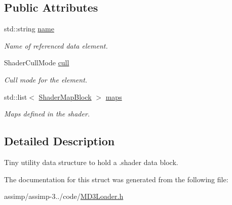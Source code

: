 \subsection*{Public Attributes}
\begin{DoxyCompactItemize}
\item 
\hypertarget{struct_assimp_1_1_q3_shader_1_1_shader_data_block_af92045c74885b17047797307b35e5934}{std\+::string \hyperlink{struct_assimp_1_1_q3_shader_1_1_shader_data_block_af92045c74885b17047797307b35e5934}{name}}\label{struct_assimp_1_1_q3_shader_1_1_shader_data_block_af92045c74885b17047797307b35e5934}

\begin{DoxyCompactList}\small\item\em Name of referenced data element. \end{DoxyCompactList}\item 
\hypertarget{struct_assimp_1_1_q3_shader_1_1_shader_data_block_ac17f4c0bad24634319ad041a79c470b8}{Shader\+Cull\+Mode \hyperlink{struct_assimp_1_1_q3_shader_1_1_shader_data_block_ac17f4c0bad24634319ad041a79c470b8}{cull}}\label{struct_assimp_1_1_q3_shader_1_1_shader_data_block_ac17f4c0bad24634319ad041a79c470b8}

\begin{DoxyCompactList}\small\item\em Cull mode for the element. \end{DoxyCompactList}\item 
\hypertarget{struct_assimp_1_1_q3_shader_1_1_shader_data_block_aa09799be83956862cd63eb67fc0b0d20}{std\+::list$<$ \hyperlink{struct_assimp_1_1_q3_shader_1_1_shader_map_block}{Shader\+Map\+Block} $>$ \hyperlink{struct_assimp_1_1_q3_shader_1_1_shader_data_block_aa09799be83956862cd63eb67fc0b0d20}{maps}}\label{struct_assimp_1_1_q3_shader_1_1_shader_data_block_aa09799be83956862cd63eb67fc0b0d20}

\begin{DoxyCompactList}\small\item\em Maps defined in the shader. \end{DoxyCompactList}\end{DoxyCompactItemize}


\subsection{Detailed Description}
Tiny utility data structure to hold a .shader data block. 

The documentation for this struct was generated from the following file\+:\begin{DoxyCompactItemize}
\item 
assimp/assimp-\/3../code/\hyperlink{_m_d3_loader_8h}{M\+D3\+Loader.\+h}\end{DoxyCompactItemize}
